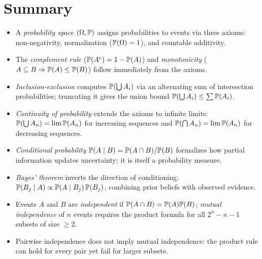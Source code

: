 \documentclass[11pt,a4paper]{article}
\begin{document}

\section{Summary}
\label{sec:summary}

\begin{itemize}
    \item A \emph{probability space} $(\Omega, \mathbb{P})$ assigns
    probabilities to events via three axioms: non-negativity,
    normalization ($\mathbb{P}(\Omega) = 1$), and countable additivity.
    \item The \emph{complement rule} ($\mathbb{P}(A^c) = 1 - \mathbb{P}(A)$) and
    \emph{monotonicity} ($A \subseteq B \Rightarrow \mathbb{P}(A) \leq
    \mathbb{P}(B)$) follow immediately from the axioms.
    \item \emph{Inclusion-exclusion} computes $\mathbb{P}(\bigcup A_i)$ via an
    alternating sum of intersection probabilities; truncating it gives the
    union bound $\mathbb{P}(\bigcup A_i) \leq \sum \mathbb{P}(A_i)$.
    \item \emph{Continuity of probability} extends the axioms to infinite
    limits: $\mathbb{P}(\bigcup A_n) = \lim \mathbb{P}(A_n)$ for increasing
    sequences and $\mathbb{P}(\bigcap A_n) = \lim \mathbb{P}(A_n)$ for decreasing
    sequences.
    \item \emph{Conditional probability}
    $\mathbb{P}(A \mid B) = \mathbb{P}(A \cap B)/\mathbb{P}(B)$ formalizes how partial
    information updates uncertainty; it is itself a probability measure.
    \item \emph{Bayes' theorem} inverts the direction of conditioning:
    $\mathbb{P}(B_j \mid A) \propto \mathbb{P}(A \mid B_j) \, \mathbb{P}(B_j)$,
    combining prior beliefs with observed evidence.
    \item Events $A$ and $B$ are \emph{independent} if
    $\mathbb{P}(A \cap B) = \mathbb{P}(A)\mathbb{P}(B)$; \emph{mutual independence}
    of $n$ events requires the product formula for all $2^n - n - 1$
    subsets of size $\geq 2$.
    \item Pairwise independence does not imply mutual independence:
    the product rule can hold for every pair yet fail for larger subsets.
\end{itemize}

\end{document}
